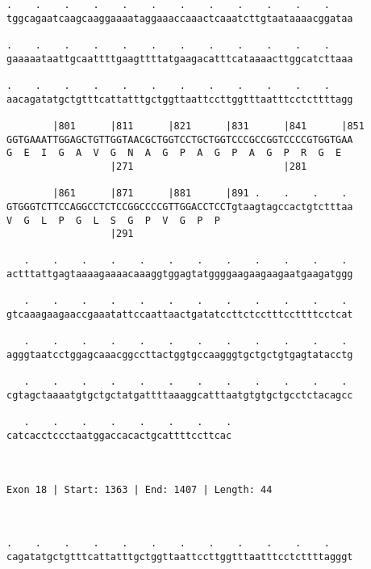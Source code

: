 \documentclass{article}
\begin{document}
\begin{Verbatim}
.    .    .    .    .    .    .    .    .    .    .    .    
tggcagaatcaagcaaggaaaataggaaaccaaactcaaatcttgtaataaaacggataa
                                                            
.    .    .    .    .    .    .    .    .    .    .    .    
gaaaaataattgcaattttgaagttttatgaagacatttcataaaacttggcatcttaaa
                                                            
.    .    .    .    .    .    .    .    .    .    .    .    
aacagatatgctgtttcattatttgctggttaattccttggtttaatttcctcttttagg
                                                            
        |801      |811      |821      |831      |841      |851
GGTGAAATTGGAGCTGTTGGTAACGCTGGTCCTGCTGGTCCCGCCGGTCCCCGTGGTGAA
G  E  I  G  A  V  G  N  A  G  P  A  G  P  A  G  P  R  G  E  
                  |271                          |281        
  
        |861      |871      |881      |891 .    .    .    . 
GTGGGTCTTCCAGGCCTCTCCGGCCCCGTTGGACCTCCTgtaagtagccactgtctttaa
V  G  L  P  G  L  S  G  P  V  G  P  P                       
                  |291                                      
  
   .    .    .    .    .    .    .    .    .    .    .    . 
actttattgagtaaaagaaaacaaaggtggagtatggggaagaagaagaatgaagatggg
                                                            
   .    .    .    .    .    .    .    .    .    .    .    . 
gtcaaagaagaaccgaaatattccaattaactgatatccttctcctttccttttcctcat
                                                            
   .    .    .    .    .    .    .    .    .    .    .    . 
agggtaatcctggagcaaacggccttactggtgccaagggtgctgctgtgagtatacctg
                                                            
   .    .    .    .    .    .    .    .    .    .    .    . 
cgtagctaaaatgtgctgctatgattttaaaggcatttaatgtgtgctgcctctacagcc
                                                            
   .    .    .    .    .    .    .    .
catcacctccctaatggaccacactgcattttccttcac
                                       
                                       
 
Exon 18 | Start: 1363 | End: 1407 | Length: 44



.    .    .    .    .    .    .    .    .    .    .    .    
cagatatgctgtttcattatttgctggttaattccttggtttaatttcctcttttagggt
                                                            

\end{Verbatim}
\end{document}
